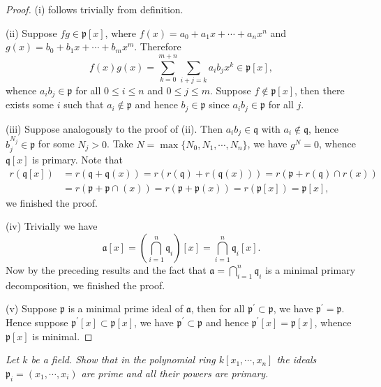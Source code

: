 \begin{proof}
(i) follows trivially from definition.\par
(ii) Suppose $fg\in\mathfrak{p}[x]$, where $f(x)=a_0+a_1x+\cdots+a_nx^n$ and $g(x)=b_0+b_1x+\cdots+b_mx^m$. Therefore 
$$
f\left( x \right) g\left( x \right) =\sum_{k=0}^{m+n}{\sum_{i+j=k}{a_ib_jx^k}}\in \mathfrak{p} \left[ x \right] ,
$$
whence $a_ib_j\in\mathfrak{p}$ for all $0\le i\le n$ and $0\le j\le m$. Suppose $f\notin\mathfrak{p}[x]$, then there exists some $i$ such that $a_i\notin\mathfrak{p}$ and hence $b_j\in\mathfrak{p}$ since $a_ib_j\in\mathfrak{p}$ for all $j$.\par
(iii) Suppose analogously to the proof of (ii). Then $a_ib_j\in\mathfrak{q}$ with $a_i\notin\mathfrak{q}$, hence $b_j^{N_j}\in\mathfrak{p}$ for some $N_j>0$. Take $N=\max\{N_0,N_1,\cdots,N_n\}$, we have $g^N=0$, whence $\mathfrak{q}[x]$ is primary. Note that 
$$
\begin{aligned}
r\left( \mathfrak{q} \left[ x \right] \right) &=r\left( \mathfrak{q} +\mathfrak{q} \left( x \right) \right) =r\left( r\left( \mathfrak{q} \right) +r\left( \mathfrak{q} \left( x \right) \right) \right) =r\left( \mathfrak{p} +r\left( \mathfrak{q} \right) \cap r\left( x \right) \right) 
\\
&=r\left( \mathfrak{p} +\mathfrak{p} \cap \left( x \right) \right) =r\left( \mathfrak{p} +\mathfrak{p} \left( x \right) \right) =r\left( \mathfrak{p} \left[ x \right] \right) =\mathfrak{p} \left[ x \right] ,
\end{aligned}
$$
we finished the proof.\par
(iv) Trivially we have 
$$
\mathfrak{a} \left[ x \right] =\left( \bigcap_{i=1}^n{\mathfrak{q} _i} \right) \left[ x \right] =\bigcap_{i=1}^n{\mathfrak{q} _i\left[ x \right]}.
$$
Now by the preceding results and the fact that $\mathfrak{a}=\bigcap_{i=1}^n\mathfrak{q}_i$ is a minimal primary decomposition, we finished the proof.\par
(v) Suppose $\mathfrak{p}$ is a minimal prime ideal of $\mathfrak{a}$, then for all $\mathfrak{p}^\prime\subset\mathfrak{p}$, we have $\mathfrak{p}^\prime=\mathfrak{p}$. Hence suppose $\mathfrak{p}^{\prime}[x]\subset\mathfrak{p}[x]$, we have $\mathfrak{p}^\prime\subset\mathfrak{p}$ and hence $\mathfrak{p}^\prime[x]=\mathfrak{p}[x]$, whence $\mathfrak{p}[x]$ is minimal.
\end{proof}
\begin{problem}\em
Let $k$ be a field. Show that in the polynomial ring $k[x_1,\cdots,x_n]$ the ideals $\mathfrak{p}_i=(x_1,\cdots,x_i)$ are prime and all their powers are primary.
\end{problem}
